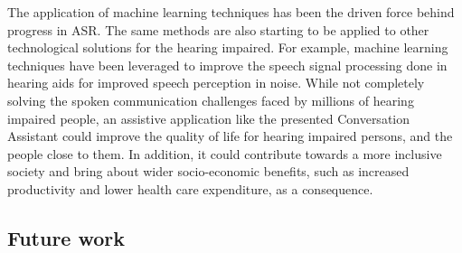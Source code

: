 \documentclass[english, 12pt, a4paper, pdftex, elec, utf8]{aaltothesis}
\begin{document}
The application of machine learning techniques has been the driven force behind progress in ASR. The same methods are also starting to be applied to other technological solutions for the hearing impaired. For example, machine learning techniques have been leveraged to improve the speech signal processing done in hearing aids \cite{goehring2016speech} for improved speech perception in noise. While not completely solving the spoken communication challenges faced by millions of hearing impaired people, an assistive application like the presented Conversation Assistant could improve the quality of life for hearing impaired persons, and the people close to them. In addition, it could contribute towards a more inclusive society and bring about wider socio-economic benefits, such as increased productivity and lower health care expenditure, as a consequence.

\subsection{Future work}
\end{document}
